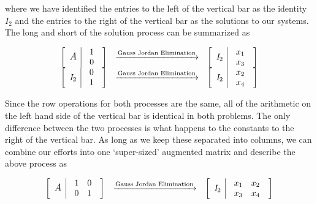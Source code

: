 \documentclass{ximera}
\begin{document}
where we have identified the entries to the left of the vertical bar as the identity $I_2$ and the entries to the right of the vertical bar as the solutions to our systems.  The long and short of the solution process can be summarized as

\[ \begin{array}{ccc}

\left[
\begin{array}{c|c}
{\large\textit{A}} &
\begin{array}{r}
1\\
0
\end{array}
\end{array}
\right]
&
\xrightarrow{\text{Gauss Jordan Elimination}}
&
\left[
\begin{array}{c|c}
\textit{I}_2 &
\begin{array}{r}
x_1\\
x_3
\end{array}
\end{array}
\right]

\\

\left[
\begin{array}{c|c}
\textit{I}_2 &
\begin{array}{r}
0\\
1
\end{array}
\end{array}
\right]
&
\xrightarrow{\text{Gauss Jordan Elimination}}
&
\left[
\begin{array}{c|c}
\textit{I}_2  &
\begin{array}{r}
x_2\\
x_4
\end{array}
\end{array}
\right]

\end{array}\]

Since the row operations for both processes are the same, all of the arithmetic on the left hand side of the vertical bar is identical in both problems.  The only difference between the two processes is what happens to the constants to the right of the vertical bar.  As long as we keep these separated into columns, we can combine our efforts into one `super-sized' augmented matrix and describe the above process as

\[ \begin{array}{ccc}

\left[
\begin{array}{c|c}
{\large\textit{A}} &
\begin{array}{rr}
1 & 0\\
0 & 1
\end{array}
\end{array}
\right]
&
\xrightarrow{\text{Gauss Jordan Elimination}}
&
\left[
\begin{array}{c|c}
\textit{I}_2 &
\begin{array}{rr}
x_1 & x_2\\
x_3 & x_4
\end{array}
\end{array}
\right]

\end{array}\]
\end{document}
